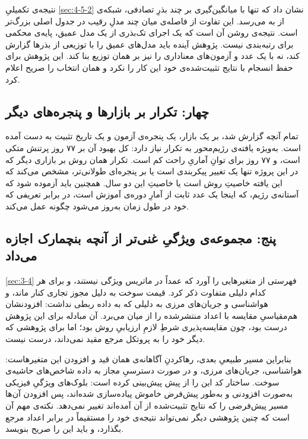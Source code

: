 نتیجه‌ی تکمیلیِ \cref{sec:4-5-2} نشان داد که تنها با میانگین‌گیری بر چند بذرِ
تصادفی،  شبکه‌ی  از  به  می‌رسد. این
تفاوت از فاصله‌ی میان چند مدلِ رقیب در جدول اصلی بزرگ‌تر است. نتیجه‌ی روشن آن
است که یک اجرای تک‌بذری از یک مدل عمیق، پایه‌ی محکمی برای رتبه‌بندی نیست.
پژوهش آینده باید مدل‌های عمیق را با توزیعی از بذرها گزارش کند، نه با یک عدد 
و آزمون‌های معناداری را نیز بر همان توزیع بنا کند. این پژوهش برای حفظ انسجام با
نتایج تثبیت‌شده‌ی خود این کار را نکرد و همان انتخاب را صریح اعلام کرد.

\subsection*{چهار: تکرار بر بازارها و پنجره‌های دیگر}

تمام آنچه گزارش شد، بر یک بازار، یک پنجره‌ی آزمون و یک تاریخ تثبیت به دست آمده
است. به‌ویژه یافته‌ی رژیم‌محور به تکرار نیاز دارد: کل بهبود آن بر ۷۷ روز پرتنش
متکی است، و ۷۷ روز برای توانِ آماریِ راحت کم است. تکرار همان روش بر بازاری دیگر
 که در این پروژه تنها یک تغییر پیکربندی است  یا بر پنجره‌ای طولانی‌تر،
مشخص می‌کند که این یافته خاصیتِ روش است یا خاصیتِ این دو سال. همچنین باید آزموده
شود که آستانه‌ی رژیم، که اینجا یک عدد ثابت از آمارِ دوره‌ی آموزش است، در برابر
تعریفی که خود در طول زمان به‌روز می‌شود چگونه عمل می‌کند.

\subsection*{پنج: مجموعه‌ی ویژگیِ غنی‌تر از آنچه بنچمارک اجازه می‌داد}

\cref{sec:3-4} فهرستی از متغیرهایی را آورد که عمداً در ماتریس ویژگی نیستند، و
برای هر کدام دلیلی متفاوت ذکر کرد. قیمت سوخت به دلیل مجوز تجاری کنار ماند، و
هواشناسی و جریان‌های مرزی به دلیلی که به داده ربطی نداشت: افزودنشان هم‌مقیاسیِ
مقایسه با اعداد منتشرشده را از میان می‌برد. آن مبادله برای این پژوهش درست بود،
چون مقایسه‌پذیری شرطِ لازمِ ارزیابیِ روش بود؛ اما برای پژوهشی که دیگر خود را به
پروتکل مرجع مقید نمی‌داند، درست نیست.

بنابراین مسیر طبیعیِ بعدی، رهاکردنِ آگاهانه‌ی همان قید و افزودن این متغیرهاست:
هواشناسی، جریان‌های مرزی، و  در صورت دسترسیِ مجاز به داده  شاخص‌های
حاشیه‌ی سوخت. ساختار کد این را از پیش پیش‌بینی کرده است: بلوک‌های ویژگیِ فیزیکی
به‌صورت افزودنی و به‌طور پیش‌فرض خاموش پیاده‌سازی شده‌اند، پس افزودن آن‌ها مسیر
پیش‌فرضی را که نتایج تثبیت‌شده از آن آمده‌اند تغییر نمی‌دهد. نکته‌ی مهم آن است که
چنین پژوهشی دیگر نمی‌تواند نتیجه‌ی خود را مستقیماً در برابر اعداد مرجع بگذارد، و
باید این را صریح بنویسد.


